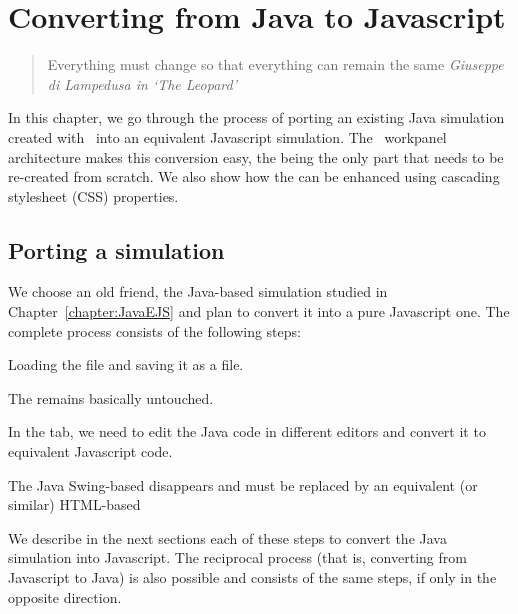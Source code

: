 
\chapter{Converting from Java to Javascript}\label{chapter:JavatoJS}

\begin{quote}
Everything must change so that everything can remain the same  {\em Giuseppe di Lampedusa in `The Leopard'}
\end{quote}

In this chapter, we go through the process of porting an existing Java simulation created with \ejs\ into an equivalent Javascript simulation. The \ejs\ workpanel architecture makes this conversion easy, the  being the only part that needs to be re-created from scratch.  We also show how the   can be enhanced using cascading stylesheet (CSS) properties.

    \section{Porting a simulation}\label{section:04Loading}

We choose an old friend, the  Java-based simulation studied in Chapter~\ref{chapter:JavaEJS} and plan to convert it into a pure Javascript one. The complete process consists of the following steps:

\begin{numberlist}

  \item Loading the  file and saving it as a  file.
  \item The  remains basically untouched.
  \item In the  tab, we need to edit the Java code in different editors and convert it to equivalent Javascript code.
  \item The Java Swing-based  disappears and must be replaced by an equivalent (or similar) HTML-based 

\end{numberlist}

We describe in the next sections each of these steps to convert the   Java simulation into Javascript. The reciprocal  process (that is, converting from Javascript to Java) is also possible and consists of the same steps, if only in the opposite direction.

